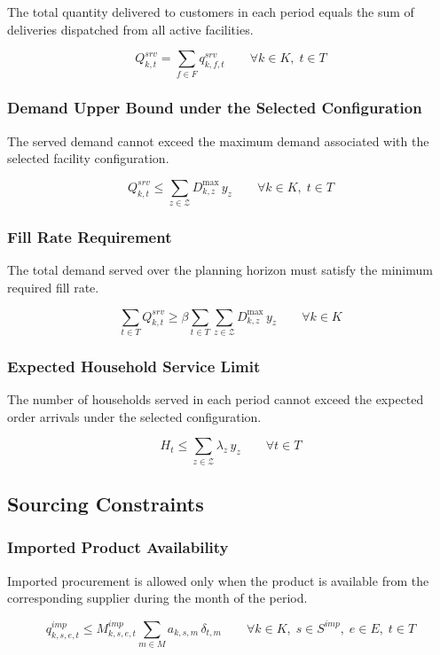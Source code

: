 \documentclass[12pt]{article}
\begin{document}
The total quantity delivered to customers in each period equals the sum of deliveries dispatched from all active facilities.

\[
Q^{srv}_{k,t} = \sum_{f \in F} q^{srv}_{k,f,t}
\qquad \forall k \in K,\; t \in T
\]

\subsubsection{Demand Upper Bound under the Selected Configuration}

The served demand cannot exceed the maximum demand associated with the selected facility configuration.

\[
Q^{srv}_{k,t} \leq \sum_{z \in \mathcal{Z}} D^{\max}_{k,z}\, y_z
\qquad \forall k \in K,\; t \in T
\]

\subsubsection{Fill Rate Requirement}

The total demand served over the planning horizon must satisfy the minimum required fill rate.

\[
\sum_{t \in T} Q^{srv}_{k,t}
\geq
\beta \sum_{t \in T} \sum_{z \in \mathcal{Z}} D^{\max}_{k,z}\, y_z
\qquad \forall k \in K
\]

\subsubsection{Expected Household Service Limit}

The number of households served in each period cannot exceed the expected order arrivals under the selected configuration.

\[
H_t \leq \sum_{z \in \mathcal{Z}} \lambda_z\, y_z
\qquad \forall t \in T
\]

\subsection{Sourcing Constraints}

\subsubsection{Imported Product Availability}

Imported procurement is allowed only when the product is available from the corresponding supplier during the month of the period.

\[
q^{imp}_{k,s,e,t}
\leq
M^{imp}_{k,s,e,t}
\sum_{m \in M} a_{k,s,m}\,\delta_{t,m}
\qquad
\forall k \in K,\; s \in S^{imp},\; e \in E,\; t \in T
\]
\end{document}

